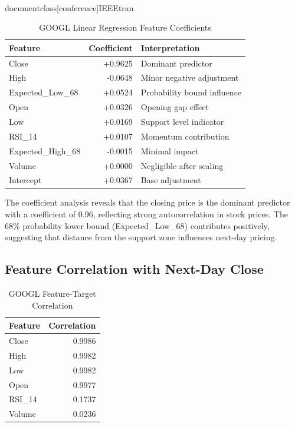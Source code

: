 \\documentclass[conference]{IEEEtran}
\begin{document}
\begin{table}[H]
\caption{GOOGL Linear Regression Feature Coefficients}
\begin{center}
\begin{tabular}{|l|r|l|}
\hline
\textbf{Feature} & \textbf{Coefficient} & \textbf{Interpretation} \\
\hline
Close & +0.9625 & Dominant predictor \\
\hline
High & -0.0648 & Minor negative adjustment \\
\hline
Expected\_Low\_68 & +0.0524 & Probability bound influence \\
\hline
Open & +0.0326 & Opening gap effect \\
\hline
Low & +0.0169 & Support level indicator \\
\hline
RSI\_14 & +0.0107 & Momentum contribution \\
\hline
Expected\_High\_68 & -0.0015 & Minimal impact \\
\hline
Volume & +0.0000 & Negligible after scaling \\
\hline
Intercept & +0.0367 & Base adjustment \\
\hline
\end{tabular}
\label{tab:googl_coefficients}
\end{center}
\end{table}

The coefficient analysis reveals that the closing price is the dominant predictor with a coefficient of 0.96, reflecting strong autocorrelation in stock prices. The 68\% probability lower bound (Expected\_Low\_68) contributes positively, suggesting that distance from the support zone influences next-day pricing.

\subsection{Feature Correlation with Next-Day Close}

\begin{table}[H]
\caption{GOOGL Feature-Target Correlation}
\begin{center}
\begin{tabular}{|l|r|}
\hline
\textbf{Feature} & \textbf{Correlation} \\
\hline
Close & 0.9986 \\
\hline
High & 0.9982 \\
\hline
Low & 0.9982 \\
\hline
Open & 0.9977 \\
\hline
RSI\_14 & 0.1737 \\
\hline
Volume & 0.0236 \\
\hline
\end{tabular}
\label{tab:googl_correlations}
\end{center}
\end{table}
\end{document}
